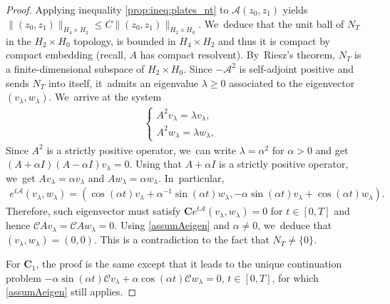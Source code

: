 \documentclass[10pt]{amsart}
\theoremstyle{definition}
\let\mc\mathcal
\let\ld\lambda
\newcommand{\A}{\mc{A}}
\newcommand{\bC}{\boldsymbol{C}}
\providecommand{\norm}[1]{\lVert#1\rVert}
\begin{document}
\begin{proof}
Applying inequality \eqref{prop:ineq:plates_nt} to $\A(z_0, z_1)$ yields $\norm{(z_0, z_1)}_{H_4\times H_2}\leq C\norm{(z_0, z_1)}_{H_2\times H_0}$. We~deduce that the unit ball of $N_T$ in the $H_2\times H_0$ topology, is bounded in $H_4\times H_2$ and thus it is compact by compact embedding (recall, $A$ has compact resolvent). By~Riesz's theorem, $N_T$ is a finite-dimensional subspace of $H_2\times H_0$. Since $-\A^2$ is self-adjoint positive and sends $N_T$ into itself, it~admits an eigenvalue $\ld\geq 0$ associated to the eigenvector $(v_\ld, w_\ld)$. We~arrive at the system
\begin{align*}
\left\{\begin{array}{cc}
A^2 v_\ld=\ld v_\ld, & \\[3pt]
A^2w_\ld=\ld w_\ld, &
\end{array}\right.
\end{align*}
Since $A^2$ is a strictly positive operator, we~can write $\lambda=\alpha^2$ for $\alpha> 0$ and get $(A+\alpha I)(A-\alpha I)v_{\lambda}=0$. Using that $A+\alpha I$ is a strictly positive operator, we~get $Av_{\lambda}=\alpha v_{\lambda}$ and $Aw_{\lambda}=\alpha w_{\lambda}$. In~particular,
\begin{align*}
e^{t\A}(v_\ld, w_\ld)=(\cos(\alpha t)v_\ld+\alpha^{-1}\sin (\alpha t) w_\ld,-\alpha\sin(\alpha t)v_\ld+\cos (\alpha t) w_\ld).
\end{align*}
Therefore, such eigenvector must satisfy $\bC e^{t\A}(v_\ld, w_\ld)=0$ for $t\in [0,T]$ and hence $\mc{C}A v_\ld=\mc{C}A w_\ld=0$. Using \cref{assumAeigen} and $\alpha\neq 0$, we~deduce that $(v_\ld,w_{\ld})=(0,0)$. This is a contradiction to the fact that $N_T\neq \{0\}$.

For $\bC_1$, the proof is the same except that it leads to the unique continuation problem $-\alpha\sin(\alpha t)\mc{C}v_\ld+\alpha \cos (\alpha t) \mc{C}w_\ld=0$, $t\in [0,T]$, for which \cref{assumAeigen} still applies.
\end{proof}
\end{document}
